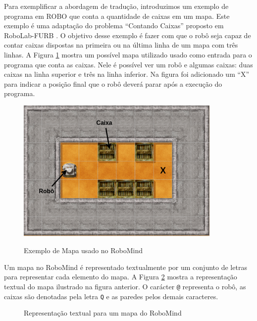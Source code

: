 Para exemplificar a abordagem de tradução, introduzimos um exemplo de programa em ROBO que conta a quantidade de caixas em um mapa. Este exemplo é uma adaptação do problema ``Contando Caixas'' proposto em RoboLab-FURB \cite{furb}. O objetivo desse exemplo é fazer com que o robô seja capaz de contar caixas dispostas na primeira ou na última linha de um mapa com três linhas.  A Figura \ref{fig:map} mostra um possível mapa utilizado usado como entrada para o programa que conta as caixas. Nele é possível ver um robô e algumas caixas: duas caixas na linha superior e três na linha inferior. Na figura foi adicionado um ``X'' para indicar a posição final que o robô deverá parar após a execução do programa. 

\begin{figure}[h]
\centering
\caption{Exemplo de Mapa usado no RoboMind}
\includegraphics[height=7cm]{figuras/map2.png}
\label{fig:map}
\end{figure}

Um mapa no RoboMind é representado textualmente por um conjunto de letras para representar cada elemento do mapa. A Figura \ref{fig:maprobo} mostra a representação textual do mapa ilustrado na figura anterior. O carácter \texttt{@} representa o robô, as caixas são denotadas pela letra \texttt{Q} e as paredes pelos demais caracteres.

\begin{figure}[h]
\centering
\caption{Representação textual para um mapa do RoboMind}

\label{fig:maprobo}
\end{figure}

